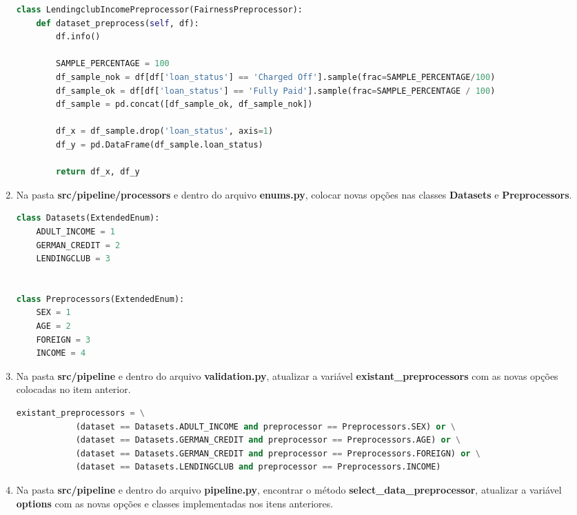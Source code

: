\documentclass[Portugues,Final]{ic-tese-v3}
\begin{document}
\begin{enumerate}
\begin{lstlisting}[language=Python, label=cod:FairnessPreprocessor]
class LendingclubIncomePreprocessor(FairnessPreprocessor):
    def dataset_preprocess(self, df):
        df.info()

        SAMPLE_PERCENTAGE = 100
        df_sample_nok = df[df['loan_status'] == 'Charged Off'].sample(frac=SAMPLE_PERCENTAGE/100)
        df_sample_ok = df[df['loan_status'] == 'Fully Paid'].sample(frac=SAMPLE_PERCENTAGE / 100)
        df_sample = pd.concat([df_sample_ok, df_sample_nok])

        df_x = df_sample.drop('loan_status', axis=1)
        df_y = pd.DataFrame(df_sample.loan_status)

        return df_x, df_y
\end{lstlisting}

\item Na pasta \textbf{src/pipeline/processors} e dentro do arquivo \textbf{enums.py}, colocar novas opções nas classes \textbf{Datasets} e \textbf{Preprocessors}.

\begin{lstlisting}[language=Python, label=cod:EnumOptions]
class Datasets(ExtendedEnum):
    ADULT_INCOME = 1
    GERMAN_CREDIT = 2
    LENDINGCLUB = 3


class Preprocessors(ExtendedEnum):
    SEX = 1
    AGE = 2
    FOREIGN = 3
    INCOME = 4
\end{lstlisting}

\item Na pasta \textbf{src/pipeline} e dentro do arquivo \textbf{validation.py}, atualizar a variável \textbf{existant\_preprocessors} com as novas opções colocadas no item anterior.

\begin{lstlisting}[language=Python, label=cod:ValidationPreprocessors]
        existant_preprocessors = \
            (dataset == Datasets.ADULT_INCOME and preprocessor == Preprocessors.SEX) or \
            (dataset == Datasets.GERMAN_CREDIT and preprocessor == Preprocessors.AGE) or \
            (dataset == Datasets.GERMAN_CREDIT and preprocessor == Preprocessors.FOREIGN) or \
            (dataset == Datasets.LENDINGCLUB and preprocessor == Preprocessors.INCOME)
\end{lstlisting}

\item Na pasta \textbf{src/pipeline} e dentro do arquivo \textbf{pipeline.py}, encontrar o método \textbf{select\_data\_preprocessor}, atualizar a variável \textbf{options} com as novas opções e classes implementadas nos itens anteriores.


\end{enumerate}
\end{document}
